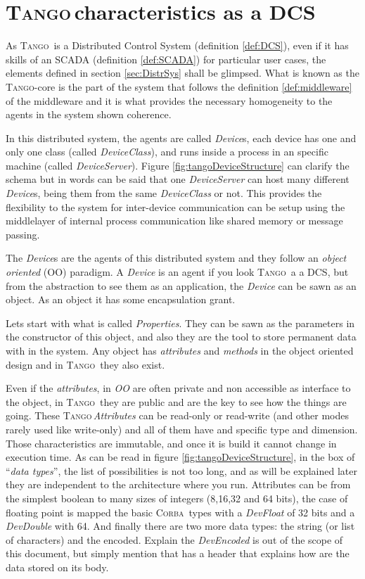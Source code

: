 \documentclass[10pt,a4paper,twoside]{llncs}
\newcommand{\tango}{\textsc{Tango}}
\newcommand{\corba}{\textsc{Corba}}
\begin{document}
\section{\tango\,characteristics as a DCS}\label{sec:characteristics}

As \tango\, is a Distributed Control System (definition \ref{def:DCS}), even if it has skills of an SCADA (definition \ref{def:SCADA}) for particular user cases, the elements defined in section \ref{sec:DistrSys} shall be glimpsed. What is known as the \tango-core is the part of the system that follows the definition \ref{def:middleware} of the middleware and it is what provides the necessary homogeneity to the agents in the system shown coherence.

In this distributed system, the agents are called \emph{Device}s, each device has one and only one class (called \emph{DeviceClass}), and runs inside a process in an specific machine (called \emph{DeviceServer}). Figure \ref{fig:tangoDeviceStructure} can clarify the schema but in words can be said that one \emph{DeviceServer} can host many different \emph{Device}s, being them from the same \emph{DeviceClass} or not. This provides the flexibility to the system for inter-device communication can be setup using the middlelayer of internal process communication like shared memory or message passing.

The \emph{Device}s are the agents of this distributed system and they follow an \emph{object oriented} (OO) paradigm. A \emph{Device} is an agent if you look \tango\, a a DCS, but from the abstraction to see them as an application, the \emph{Device} can be sawn as an object. As an object it has some encapsulation grant.

Lets start with what is called \emph{Properties}. They can be sawn as the parameters in the constructor of this object, and also they are the tool to store permanent data with in the system. Any object has \emph{attributes} and \emph{methods} in the object oriented design and in \tango\, they also exist.

Even if the \emph{attributes}, in \emph{OO} are often private and non accessible as interface to the object, in \tango\, they are public and are the key to see how the things are going. These \tango\,\emph{Attributes} can be read-only or read-write (and other modes rarely used like write-only) and all of them have and specific type and dimension. Those characteristics are immutable, and once it is build it cannot change in execution time. As can be read in figure \ref{fig:tangoDeviceStructure}, in the box of ``\emph{data types}'', the list of possibilities is not too long, and as will be explained later they are independent to the architecture where you run. Attributes can be from the simplest boolean to many sizes of integers (8,16,32 and 64 bits), the case of floating point is mapped the basic \corba\, types with a \emph{DevFloat} of 32 bits and a \emph{DevDouble} with 64. And finally there are two more data types: the string (or list of characters) and the encoded. Explain the \emph{DevEncoded} is out of 
the scope of this document, but simply mention that has a header that explains how are the data stored on its body.
\end{document}
